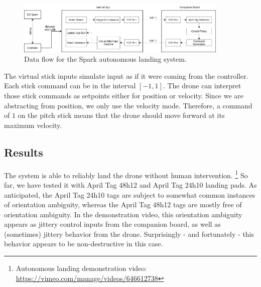 \begin{figure}[ht]
    \centering
    \includegraphics[width=0.9\textwidth]{images/spark_architecture.drawio}
    \caption{Data flow for the Spark autonomous landing system.}
    \label{figure:spark_architecture}
\end{figure}

The virtual stick inputs simulate input as if it were coming from the controller.
Each stick command can be in the interval $[-1, 1]$.
The drone can interpret those stick commands as setpoints either for position or velocity.
Since we are abstracting from position, we only use the velocity mode.
Therefore, a command of $1$ on the pitch stick
means that the drone should move forward at its maximum velocity.

\subsection{Results}

The system is able to reliably land the drone without human intervention.
\footnote{Autonomous landing demonstration video: \url{https://vimeo.com/manage/videos/646612738}}
So far, we have tested it with April Tag 48h12 and April Tag 24h10 landing pads.
As anticipated, the April Tag 24h10 tags are subject to somewhat common instances of orientation ambiguity,
whereas the April Tag 48h12 tags are mostly free of orientation ambiguity.
In the demonstration video, this orientation ambiguity appears as jittery control inputs from the companion board,
as well as (sometimes) jittery behavior from the drone.
Surprisingly - and fortunately - this behavior appears to be non-destructive in this case.

